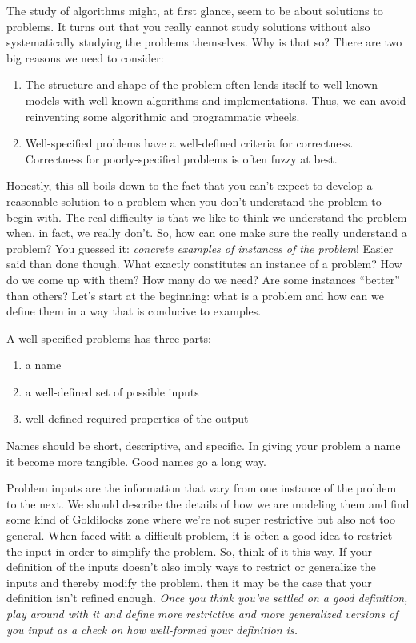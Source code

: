 \documentclass[]{tufte-handout}
\begin{document}
The study of algorithms might, at first glance, seem to be about solutions to problems.  It turns out that you really cannot study solutions without also systematically studying the problems themselves.  Why is that so? There are two big reasons we need to consider:
\begin{enumerate}
\item The structure and shape of the problem often lends itself to well known models with well-known algorithms and implementations. Thus, we can avoid reinventing some algorithmic and programmatic wheels.
\item Well-specified problems have a well-defined criteria for correctness.  Correctness for poorly-specified problems is often fuzzy at best.
\end{enumerate}

Honestly, this all boils down to the fact that you can't expect to develop a reasonable solution to a problem when you don't understand the problem to begin with.  The real difficulty is that we like to think we understand the problem when, in fact, we really don't.  So, how can one make sure the really understand a problem?  You guessed it: \textit{concrete examples of instances of the problem}! Easier said than done though. What exactly constitutes an instance of a problem? How do we come up with them? How many do we need? Are some instances ``better'' than others? Let's start at the beginning: what is a problem and how can we define them in a way that is conducive to examples.  

A well-specified problems has three parts:
\begin{enumerate}
\item a name
\item a well-defined set of possible inputs
\item well-defined required properties of the output
\end{enumerate}
Names should be short, descriptive, and specific. In giving your problem a name it become more tangible. Good names go a long way.

Problem inputs are the information that vary from one instance of the problem to the next.  We should describe the details of how we are modeling them and find some kind of Goldilocks zone where we're not super restrictive but also not too general.  When faced with a difficult problem, it is often a good idea to restrict the input in order to simplify the problem.  So, think of it this way. If your definition of the inputs doesn't also imply ways to restrict or generalize the inputs and thereby modify the problem, then it may be the case that your definition isn't refined enough. \textit{Once you think you've settled on a good definition, play around with it and define more restrictive and more generalized versions of you input as a check on how well-formed your definition is.} 
\end{document}
